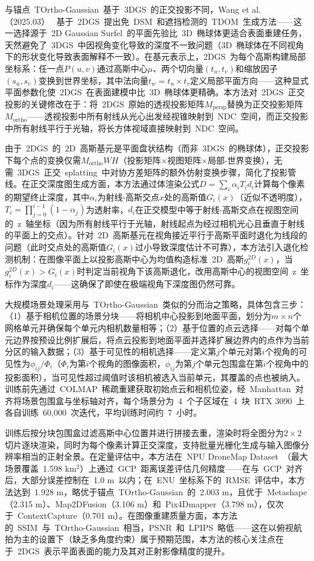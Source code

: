 与锚点~TOrtho-Gaussian~基于~3DGS~的正交投影不同，Wang et al.（2025.03）~\cite{2503_19703} 基于~2DGS~提出免~DSM~和遮挡检测的~TDOM~生成方法——这一选择源于~2D Gaussian Surfel~的平面先验比~3D~椭球体更适合表面重建任务，天然避免了~3DGS~中因视角变化导致的深度不一致问题（3D~椭球体在不同视角下的形状变化导致表面解释不一致）。在基元表示上，2DGS~为每个高斯构建局部坐标系：任一点$P(u,v)$通过高斯中心$\mu$、两个切向量$(t_u, t_v)$和缩放因子$(s_u, s_v)$变换到世界坐标，其中法向量$t_w = t_u \times t_v$定义局部平面方向——这种显式平面参数化使~2DGS~在表面建模中比~3D~椭球体更精确。本方法对~2DGS~正交投影的关键修改在于：将~2DGS~原始的透视投影矩阵$M_{\text{persp}}$替换为正交投影矩阵$M_{\text{ortho}}$——透视投影中所有射线从光心出发经视锥映射到~NDC~空间，而正交投影中所有射线平行于光轴，将长方体视域直接映射到~NDC~空间。

由于~2DGS~的~2D~高斯基元是平面盘状结构（而非~3DGS~的椭球体），正交投影下每个点的变换仅需$M_{\text{ortho}}WH$（投影矩阵$\times$视图矩阵$\times$局部-世界变换），无需~3DGS~正交~splatting~中对协方差矩阵的额外仿射变换步骤，简化了投影管线。在正交深度图生成方面，本方法通过体渲染公式$D = \sum_i \alpha_i T_i d_i$计算每个像素的期望终止深度，其中$\alpha_i$为射线-高斯交点$x$处的高斯值$G_i(x)$（近似不透明度），$T_i = \prod_{j=0}^{i-1}(1-\alpha_j)$为透射率，$d_i$在正交模型中等于射线-高斯交点在视图空间的~z~轴坐标（因为所有射线平行于光轴，射线起点为经过相机光心且垂直于射线的平面上的交点）。针对~2D~高斯基元在视角接近平行于高斯平面时退化为线段的问题（此时交点处的高斯值$G_i(x)$过小导致深度估计不可靠），本方法引入退化检测机制：在图像平面上以投影高斯中心为均值构造标准~2D~高斯$g_i^{2D}(x)$，当$g_i^{2D}(x) > G_i(x)$时判定当前视角下该高斯退化，改用高斯中心的视图空间~z~坐标作为深度$d_i$——这确保了即使在极端视角下深度图仍然可靠。

大规模场景处理采用与~TOrtho-Gaussian~类似的分而治之策略，具体包含三步：（1）基于相机位置的场景分块——将相机中心投影到地面平面，划分为$m \times n$个网格单元并确保每个单元内相机数量相等；（2）基于位置的点云选择——对每个单元边界按预设比例扩展后，将点云投影到地面平面并选择扩展边界内的点作为当前分区的输入数据；（3）基于可见性的相机选择——定义第$j$个单元对第$i$个视角的可见性为$\phi_{ij}/\Phi_i$（$\Phi_i$为第$i$个视角的图像面积，$\phi_{ij}$为第$j$个单元包围盒在第$i$个视角中的投影面积），当可见性超过阈值时该相机被选入当前单元，其覆盖的点也被纳入。训练前先通过~COLMAP~稀疏重建获取初始点云和相机位姿，经~Manhattan~对齐将场景包围盒与坐标轴对齐，每个场景分为~4~个子区域在~4~块~RTX 3090~上各自训练~60,000~次迭代，平均训练时间约~7~小时。

训练后按分块包围盒过滤高斯中心位置并进行拼接去重，渲染时将全图分为$2 \times 2$切片逐块渲染，同时为每个像素计算正交深度，支持批量光栅化生成与输入图像分辨率相当的正射全景。在定量评估中，本方法在~NPU DroneMap Dataset~（最大场景覆盖~1.598 km$^2$）上通过~GCP~距离误差评估几何精度——在与~GCP~对齐后，大部分误差控制在~1.0 m~以内；在~ENU~坐标系下的~RMSE~评估中，本方法达到~1.928 m，略优于锚点~TOrtho-Gaussian~的~2.003 m，且优于~Metashape（2.315 m）、Map2DFusion（3.106 m）和~Pix4Dmapper（3.798 m），仅次于~ContextCapture（0.701 m）。在图像重建质量方面，本方法的~SSIM~与~TOrtho-Gaussian~相当，PSNR~和~LPIPS~略低——这在以俯视航拍为主的设置下（缺乏多角度约束）属于预期范围，本方法的核心关注点在于~2DGS~表示平面表面的能力及其对正射影像精度的提升。

